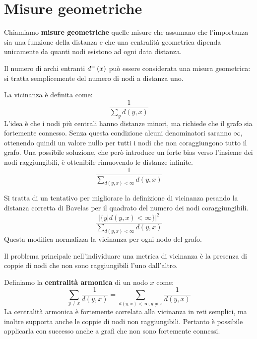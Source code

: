 \documentclass[\main/main.tex]{subfiles}
\begin{document}
\section{Misure geometriche}
\begin{multicols}{2}
\begin{definition}
    Chiamiamo \textbf{misure geometriche} quelle misure che assumano che l'importanza sia una funzione della distanza e che una centralità geometrica dipenda unicamente da quanti nodi esistono ad ogni data distanza.
\end{definition}
\begin{definition}
    Il numero di archi entranti \(d^-\left(x\right)\) può essere considerata una misura geometrica: si tratta semplicemente del numero di nodi a distanza uno.
\end{definition}
\begin{definition}
    La vicinanza è definita come:
    \[
        \frac{1}{\sum_{y} d(y, x)}
    \]
    L'idea è che i nodi più centrali hanno distanze minori, ma richiede che il grafo sia fortemente connesso. Senza questa condizione alcuni denominatori saranno \(\infty\), ottenendo quindi un valore nullo per tutti i nodi che non coraggiungono tutto il grafo.
    Una possibile soluzione, che però introduce un forte bias verso l'insieme dei nodi raggiungibili, è ottenibile rimuovendo le distanze infinite.
    \[
        \frac{1}{\sum_{d(y, x)<\infty} d(y, x)}
    \]
\end{definition}
\begin{definition}
    Si tratta di un tentativo per migliorare la definizione di vicinanza pesando la distanza corretta di Bavelas per il quadrato del numero dei nodi coraggiungibili.
    \[
        \frac{|\{y | d(y, x)<\infty\}|^{2}}{\sum_{d(y, x)<\infty} d(y, x)}
    \]
    Questa modifica normalizza la vicinanza per ogni nodo del grafo.
\end{definition}
\begin{observation}
    Il problema principale nell'individuare una metrica di vicinanza è la presenza di coppie di nodi che non sono raggiungibili l'uno dall'altro.
\end{observation}
\begin{definition}
    Definiamo la \textbf{centralità armonica} di un nodo \(x\) come:
    \[
        \sum_{y \neq x} \frac{1}{d(y, x)}=\sum_{d(y, x)<\infty, y \neq x} \frac{1}{d(y, x)}
    \]
    La centralità armonica è fortemente correlata alla vicinanza in reti semplici, ma inoltre supporta anche le coppie di nodi non raggiungibili. Pertanto è possibile applicarla con successo anche a grafi che non sono fortemente connessi.
\end{definition}
\end{multicols}
\clearpage
\end{document}
